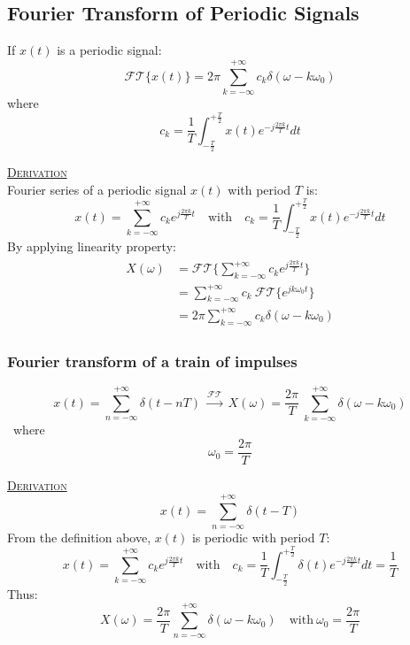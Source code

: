 \documentclass[12pt,a4paper]{article}
\begin{document}
\subsection{Fourier Transform of Periodic Signals}
If $x(t)$ is a periodic signal:
\[ \mathcal{FT} \{ x(t) \} = 2\pi \sum_{k=-\infty}^{+\infty} c_{k} \delta(\omega - k\omega_{0}) \]
where \[ c_{k}=\frac{1}{T} \int_{-\frac{T}{2}}^{+\frac{T}{2}} x(t) e^{-j\frac{2 \pi k}{T} t} dt \]
\begin{tcolorbox}[breakable]
\underline{\textsc{Derivation}}\\
Fourier series of a periodic signal $x(t)$ with period $T$ is:
\[ x(t) = \sum_{k=-\infty}^{+\infty}c_{k}e^{j \frac{2\pi k}{T}t} \quad \text{with} \quad c_{k} = \frac{1}{T} \int_{-\frac{T}{2}}^{+\frac{T}{2}} x(t)e^{-j \frac{2\pi k}{T}t} dt \]
By applying linearity property:
\begin{align*}\begin{split}
 X(\omega) &= \mathcal{FT} \bigg\{ \sum_{k=-\infty}^{+\infty}c_{k}e^{j \frac{2\pi k}{T}t} \bigg\} \\
 &=\sum_{k=-\infty}^{+\infty}c_{k} \ \mathcal{FT}\{ e^{jk\omega_{0} t}\}\\
 &= 2\pi \sum_{k=-\infty}^{+\infty} c_{k} \delta(\omega - k\omega_{0}) 
 \end{split}\end{align*}
\end{tcolorbox}

\subsubsection{Fourier transform of a train of impulses}
\[ x(t) = \sum_{n=-\infty}^{+\infty} \delta(t-nT) \ \xrightarrow{\mathcal{FT}}\ X(\omega)=\frac{2\pi}{T}  \ \sum^{+\infty}_{k=-\infty} \delta(\omega-k\omega_{0}) \]
\ where \[ \omega_{0}=\frac{2\pi}{T} \]
\begin{tcolorbox}[breakable]
\underline{\textsc{Derivation}}\\
\[ x(t) = \sum_{n=-\infty}^{+\infty} \delta(t-T) \]
From the definition above, $x(t)$ is periodic with period $T$:
\[ x(t) = \sum_{k=-\infty}^{+\infty}c_{k}e^{j \frac{2\pi k}{T}t} \quad \text{with} \quad c_{k} = \frac{1}{T} \int_{-\frac{T}{2}}^{+\frac{T}{2}} \delta(t)e^{-j \frac{2\pi k}{T}t} dt = \frac{1}{T} \]
Thus:
\[ X(\omega) = \frac{2\pi}{T}\sum_{n=-\infty}^{+\infty}  \delta(\omega-k\omega_{0}) \quad  \text{with}\  \omega_{0}=\frac{2\pi}{T}\]
\end{tcolorbox}
\end{document}
